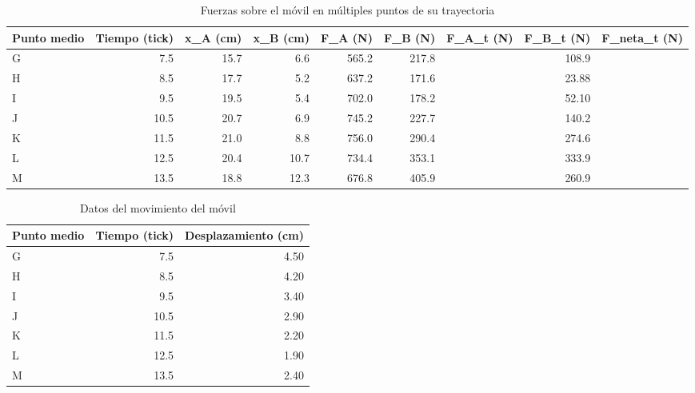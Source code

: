 \documentclass[../main.tex]{subfiles}
\begin{document}
\begin{table}[H]
  \caption{Fuerzas sobre el móvil en múltiples puntos de su trayectoria}
  \label{tab:forces}
  \begin{center}
    \begin{tabular}[c]{lrrrrrrrr}
      \toprule
      \multicolumn{1}{c}{\textbf{Punto medio}} &
      \multicolumn{1}{c}{\textbf{Tiempo} (tick)} &
      \multicolumn{1}{c}{\textbf{x_{A}} (\unit{\centi\metre})} &
      \multicolumn{1}{c}{\textbf{x_{B}} (\unit{\centi\metre})} &
      \multicolumn{1}{c}{\textbf{F_{A}} (\unit{\newton})} &
      \multicolumn{1}{c}{\textbf{F_{B}} (\unit{\newton})} &
      \multicolumn{1}{c}{\textbf{F_{A_{t}}} (\unit{\newton})} &
      \multicolumn{1}{c}{\textbf{F_{B_{t}}} (\unit{\newton})} &
      \multicolumn{1}{c}{\textbf{F_{neta_{t}}} (\unit{\newton})} \\
      \midrule
      G & \num{7,5} & \num{15,7} & \num{6,6} & \num{565,2} & \num{217,8} & \num{} & \num{108,9} & \num{} \\
      H & \num{8,5} & \num{17,7} & \num{5,2} & \num{637,2} & \num{171,6} & \num{} & \num{23,88} & \num{} \\
      I & \num{9,5} & \num{19,5} & \num{5,4} & \num{702,0} & \num{178,2} & \num{} & \num{52,10} & \num{} \\
      J & \num{10,5} & \num{20,7} & \num{6,9} & \num{745,2} & \num{227,7} & \num{} & \num{140,2} & \num{} \\
      K & \num{11,5} & \num{21,0} & \num{8,8} & \num{756,0} & \num{290,4} & \num{} & \num{274,6} & \num{} \\
      L & \num{12,5} & \num{20,4} & \num{10,7} & \num{734,4} & \num{353,1} & \num{} & \num{333,9} & \num{} \\
      M & \num{13,5} & \num{18,8} & \num{12,3} & \num{676,8} & \num{405,9} & \num{} & \num{260,9} & \num{} \\
      \bottomrule
    \end{tabular}
  \end{center}
\end{table}
\begin{table}[H]
  \caption{Datos del movimiento del móvil}
  \label{tab:intervals}
  \begin{center}
    \begin{tabular}[c]{lrr}
      \toprule
      \multicolumn{1}{c}{\textbf{Punto medio}} &
      \multicolumn{1}{c}{\textbf{Tiempo (tick)}} &
      \multicolumn{1}{c}{\textbf{Desplazamiento (\unit{\centi\metre})}} \\
      \midrule
      G & \num{7,5} & \num{4,50} \\
      H & \num{8,5} & \num{4,20} \\
      I & \num{9,5} & \num{3,40} \\
      J & \num{10,5} & \num{2,90} \\
      K & \num{11,5} & \num{2,20} \\
      L & \num{12,5} & \num{1,90} \\
      M & \num{13,5} & \num{2,40} \\
    \end{tabular}
  \end{center}
\end{table}
\end{document}
